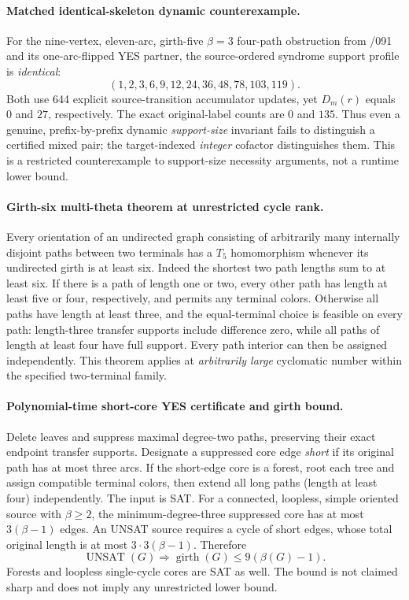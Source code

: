 \documentclass[11pt]{article}
\begin{document}
\paragraph{Matched identical-skeleton dynamic counterexample.}
For the nine-vertex, eleven-arc, girth-five $\beta=3$ four-path
obstruction from /091 and its one-arc-flipped YES partner,
the source-ordered syndrome support profile is \emph{identical}:
\[
 (1,2,3,6,9,12,24,36,48,78,103,119).
\]
Both use 644 explicit source-transition accumulator updates,
yet $D_m(r)$ equals $0$ and $27$, respectively. The exact
original-label counts are $0$ and $135$.
Thus even a genuine, prefix-by-prefix dynamic \emph{support-size}
invariant fails to distinguish a certified mixed pair; the
target-indexed \emph{integer} cofactor distinguishes them.
This is a restricted counterexample to support-size necessity
arguments, not a runtime lower bound.

\paragraph{Girth-six multi-theta theorem at unrestricted cycle rank.}
Every orientation of an undirected graph consisting of arbitrarily
many internally disjoint paths between two terminals has a $T_5$
homomorphism whenever its undirected girth is at least six.
Indeed the shortest two path lengths sum to at least six.
If there is a path of length one or two, every other path has
length at least five or four, respectively, and permits any
terminal colors. Otherwise all paths have length at least three,
and the equal-terminal choice is feasible on every path:
length-three transfer supports include difference zero, while
all paths of length at least four have full support.
Every path interior can then be assigned independently.
This theorem applies at \emph{arbitrarily large} cyclomatic number
within the specified two-terminal family.

\paragraph{Polynomial-time short-core YES certificate and girth bound.}
Delete leaves and suppress maximal degree-two paths, preserving
their exact endpoint transfer supports. Designate a suppressed
core edge \emph{short} if its original path has at most three arcs.
If the short-edge core is a forest, root each tree and assign
compatible terminal colors, then extend all long paths (length
at least four) independently. The input is SAT.
For a connected, loopless, simple oriented source with
$\beta\geq2$, the minimum-degree-three suppressed core has
at most $3(\beta-1)$ edges. An UNSAT source requires a cycle
of short edges, whose total original length is at most
$3\cdot3(\beta-1)$. Therefore
\[
\boxed{\operatorname{UNSAT}(G)\Longrightarrow
             \operatorname{girth}(G)\leq9(\beta(G)-1).}
\]
Forests and loopless single-cycle cores are SAT as well.
The bound is not claimed sharp and does not imply any
unrestricted lower bound.
\end{document}
